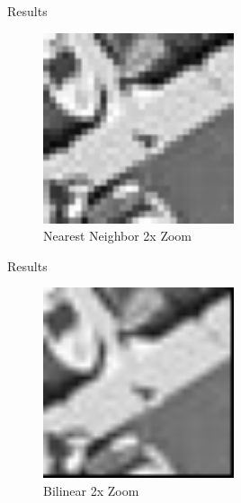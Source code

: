 \documentclass{beamer}
\begin{document}

\begin{frame}{Results}

\begin{figure}
\centering
\includegraphics[width=0.5\textwidth]{nn.png}
\caption{Nearest Neighbor 2x Zoom}
\end{figure}

\end{frame}


\begin{frame}{Results}

\begin{figure}
\centering
\includegraphics[width=0.5\textwidth]{bi.png}
\caption{Bilinear 2x Zoom}
\end{figure}

\end{frame}

\end{document}
